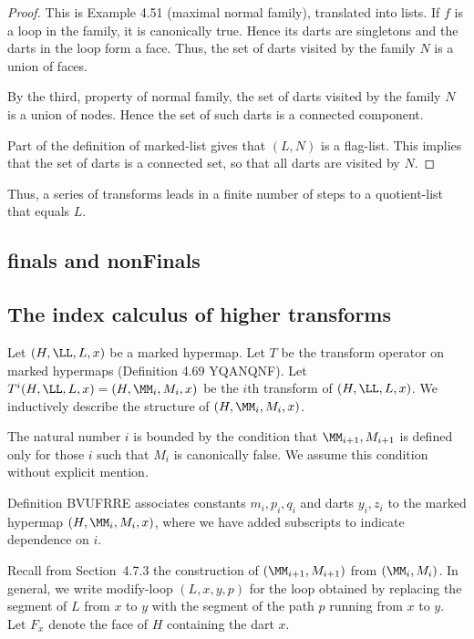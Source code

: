 \begin{proof} This is Example 4.51 (maximal normal family), translated into lists.
If $f$ is a loop in the family, it is canonically true.  Hence its
darts are singletons and the darts in the loop form a face.  Thus,
the set of darts visited by the family $N$ is a union of faces.

By the third, property of normal family, the set of darts visited by
the family $N$ is a union of nodes.  Hence the set of such darts is
a connected component. 

Part of the definition of marked-list gives that $(L,N)$ is a flag-list.  This implies
that the set of darts is a connected set,
so that all darts are visited by $N$.  
\end{proof}


Thus, a series of transforms leads in a finite number of steps to a quotient-list that equals $L$.

\subsection{finals and nonFinals}


\subsection{The index calculus of higher transforms}


Let $(H,\LL,L,x)$ be a marked hypermap.  
Let $T$ be the transform operator on marked hypermaps
(Definition 4.69 YQANQNF).  
Let $T^i(H,\LL,L,x) = (H,\MM_i,M_i,x)$ be the $i$th transform of
$(H,\LL,L,x)$.  We inductively describe the structure of $(H,\MM_i,M_i,x)$.

The natural number $i$ is bounded by the condition that $\MM_{i+1},M_{i+1}$ is defined only for those $i$ such that $M_i$ is canonically false.
We assume this condition without explicit mention.

Definition BVUFRRE associates constants $m_i,p_i,q_i$ and darts $y_i,z_i$
to the marked hypermap $(H,\MM_i,M_i,x)$, where we have added
subscripts to indicate dependence on $i$.


Recall from Section~4.7.3 the construction of $(\MM_{i+1},M_{i+1})$
from $(\MM_i,M_i)$. 
In general, we write modify-loop $(L,x,y,p)$ for the loop obtained
by replacing the segment of $L$ from $x$ to $y$ with the segment
of the path $p$ running from $x$ to $y$.
Let $F_x$ denote the face of $H$ containing the dart $x$. 

